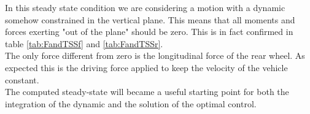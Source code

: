 In this steady state condition we are considering a motion with a dynamic somehow constrained in the vertical plane. This means that all moments and forces exerting "out of the plane" should be zero. This is in fact confirmed in table \ref{tab:FandTSSf} and \ref{tab:FandTSSr}.\\ 
The only force different from zero is the longitudinal force of the rear wheel. As expected this is the driving force applied to keep the velocity of the vehicle constant.\\
The computed steady-state will became a useful starting point for both the integration of the dynamic and the solution of the optimal control.
%